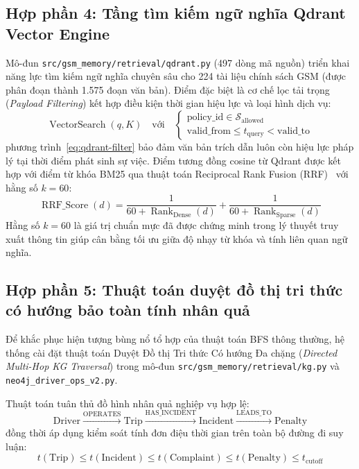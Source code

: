 \documentclass[a4paper,11pt]{article}
\begin{document}
\subsection{Hợp phần 4: Tầng tìm kiếm ngữ nghĩa Qdrant Vector Engine}
\label{sec:qdrant-vector}

Mô-đun \nolinkurl{src/gsm_memory/retrieval/qdrant.py} (497 dòng mã nguồn) triển khai năng lực tìm kiếm ngữ nghĩa chuyên sâu cho 224 tài liệu chính sách GSM (được phân đoạn thành 1.575 đoạn văn bản). Điểm đặc biệt là cơ chế lọc tải trọng (\textit{Payload Filtering}) kết hợp điều kiện thời gian hiệu lực và loại hình dịch vụ:
\begin{equation}
    \operatorname{VectorSearch}(q, K) \quad \text{với} \quad
    \begin{cases}
        \text{policy\_id} \in \mathcal{S}_{\text{allowed}} \\
        \text{valid\_from} \le t_{\text{query}} < \text{valid\_to}
    \end{cases}
    \label{eq:qdrant-filter}
\end{equation}
phương trình~\eqref{eq:qdrant-filter} bảo đảm văn bản trích dẫn luôn còn hiệu lực pháp lý tại thời điểm phát sinh sự việc. Điểm tương đồng cosine từ Qdrant được kết hợp với điểm từ khóa BM25 qua thuật toán Reciprocal Rank Fusion (RRF)~\cite{cormack2009reciprocal} với hằng số $k = 60$:
\begin{equation}
    \operatorname{RRF\_Score}(d) = \frac{1}{60 + \operatorname{Rank}_{\text{Dense}}(d)} + \frac{1}{60 + \operatorname{Rank}_{\text{Sparse}}(d)}
    \label{eq:rrf}
\end{equation}
Hằng số $k = 60$ là giá trị chuẩn mực đã được chứng minh trong lý thuyết truy xuất thông tin giúp cân bằng tối ưu giữa độ nhạy từ khóa và tính liên quan ngữ nghĩa.

\subsection{Hợp phần 5: Thuật toán duyệt đồ thị tri thức có hướng bảo toàn tính nhân quả}
\label{sec:directed-kg}

Để khắc phục hiện tượng bùng nổ tổ hợp của thuật toán BFS thông thường, hệ thống cài đặt thuật toán Duyệt Đồ thị Tri thức Có hướng Đa chặng (\textit{Directed Multi-Hop KG Traversal}) trong mô-đun \nolinkurl{src/gsm_memory/retrieval/kg.py} và \nolinkurl{neo4j_driver_ops_v2.py}. 

Thuật toán tuân thủ đồ hình nhân quả nghiệp vụ hợp lệ:
\begin{equation}
    \text{Driver} \xrightarrow{\text{OPERATES}} \text{Trip} \xrightarrow{\text{HAS\_INCIDENT}} \text{Incident} \xrightarrow{\text{LEADS\_TO}} \text{Penalty}
    \label{eq:causal-path}
\end{equation}
đồng thời áp dụng kiểm soát tính đơn điệu thời gian trên toàn bộ đường đi suy luận:
\begin{equation}
    t(\text{Trip}) \le t(\text{Incident}) \le t(\text{Complaint}) \le t(\text{Penalty}) \le t_{\text{cutoff}}
    \label{eq:causal-time}
\end{equation}
\end{document}
